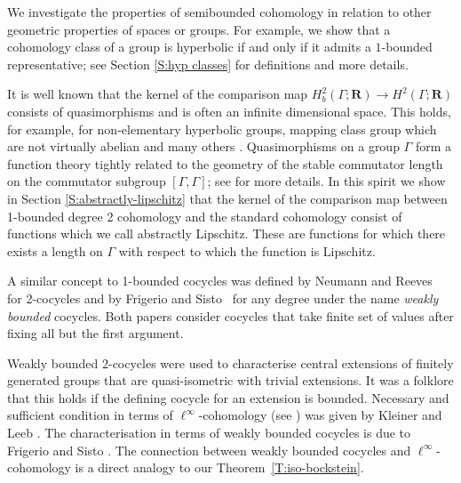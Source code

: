 \documentclass[12pt,reqno,a4paper]{amsart}
\theoremstyle{definition}
\theoremstyle{remark}
\numberwithin{equation}{section}
\numberwithin{figure}{section}
\newcommand{\B}[1]{{\mathbf #1}}
\begin{document}
We investigate the properties of semibounded cohomology in relation to other
geometric properties of spaces or groups. For example, we show that a
cohomology class of a group is hyperbolic if and only if it admits a
$1$-bounded representative; see Section \ref{S:hyp classes} for definitions and
more details.

It is well known that the kernel of the comparison map $H^2_b(\Gamma;\B R)\to
H^2(\Gamma;\B R)$ consists of quasimorphisms and is often an infinite
dimensional space. This holds, for example, for non-elementary hyperbolic groups, mapping
class group which are not virtually abelian and many others \cite{zbMATH01928904,zbMATH05658119}.
Quasimorphisms on a group $\Gamma$  form a function theory
tightly related to the geometry of the stable commutator length on the commutator
subgroup $[\Gamma,\Gamma]$; see \cite{zbMATH05577332} for more details. In this
spirit we show in Section \ref{S:abstractly-lipschitz} that the kernel of the
comparison map between 1-bounded degree 2 cohomology and the standard
cohomology consist of functions which we call abstractly Lipschitz. These are
functions for which there exists a length on $\Gamma$ with respect to which the
function is Lipschitz.

A similar concept to 1-bounded cocycles was defined by Neumann and
Reeves~\cite{zbMATH00991907} for 2-cocycles and by Frigerio and
Sisto~\cite{zbMATH07734709} for any degree under the name {\itshape weakly bounded}
cocycles.  Both papers consider cocycles that take finite set of values
after fixing all but the first argument.

Weakly bounded 2-cocycles were used to characterise central extensions of
finitely generated groups that are quasi-isometric with trivial extensions.
It was a folklore that this holds if the defining cocycle for an
extension is bounded.  Necessary and sufficient condition in terms of
$\ell^\infty$-cohomology (see \cite{arxiv.2107.09089}) was given by
Kleiner and Leeb \cite[Proposition 8.3]{zbMATH01652733}.  The characterisation in
terms of weakly bounded cocycles is due to Frigerio and Sisto \cite[Corollary
2.5]{zbMATH07734709}.
The connection between weakly bounded cocycles and $\ell^\infty$-cohomology
is a direct analogy to our Theorem~\ref{T:iso-bockstein}.
\end{document}

